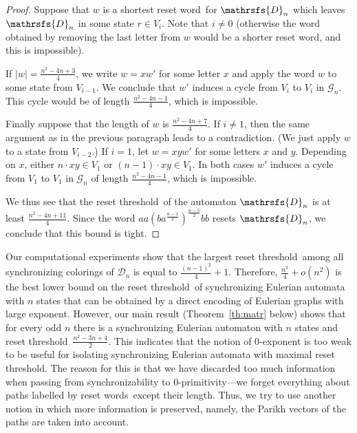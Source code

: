 \documentclass[11pt]{llncs}
\newcommand{\sw}{reset word}
\newcommand{\sws}{reset words}
\newcommand{\reth}{reset threshold}
\begin{document}
\begin{proof}
Suppose that $w$ is a shortest \sw\ for $\mathrsfs{D}_n$ which leaves
$\mathrsfs{D}_n$ in some state $r \in V_i$. Note that $i \neq 0$ (otherwise the
word obtained by removing the last letter from $w$ would be a shorter \sw, and
this is impossible).

If $|w|=\frac{n^2 -4n + 3}{4}$, we write $w = xw'$ for some letter $x$ and
apply the word $w$ to some state from $V_{i - 1}$. We conclude that $w'$
induces a cycle from $V_i$ to $V_i$ in $\mathcal{G}_n$. This cycle would be of
length $\frac{n^2 -4n - 1}{4}$, which is impossible.

Finally suppose that the length of $w$ is $\frac{n^2 -4n + 7}{4}$. If $i \neq
1$, then the same argument as in the previous paragraph leads to a
contradiction. (We just apply $w$ to a state from $V_{i - 2}$.)  If $i = 1$,
let $w = xyw'$ for some letters $x$ and $y$. Depending on $x$, either $n \cdot
xy \in V_1$ or $(n - 1) \cdot xy \in V_1$. In both cases $w'$ induces a cycle
from $V_1$ to $V_1$ in $\mathcal{G}_n$ of length $\frac{n^2 -4n - 1}{4}$, which
is impossible.

We thus see that the \reth\ of the automaton $\mathrsfs{D}_n$ is at least
$\frac{n^2 -4n + 11}{4}$. Since the word $aa(ba^{\frac{n - 1}{2}})^\frac{n -
5}{2}bb$ resets $\mathrsfs{D}_n$, we conclude that this bound is tight.
\end{proof}

Our computational experiments show that the largest \reth\ among all
synchronizing colorings of $\mathcal{D}_n$ is equal to $\frac{(n - 1)^2}{4} +
1$. Therefore, $\frac{n^2}{4} + o(n^2)$ is the best lower bound on the \reth\
of synchronizing Eulerian automata with $n$ states that can be obtained by a
direct encoding of Eulerian graphs with large exponent. However, our main
result (Theorem~\ref{th:matr} below) shows that for every odd $n$ there is a
synchronizing Eulerian automaton with $n$ states and \reth\ $\frac{n^2 -3n +
4}{2}$. This indicates that the notion of 0-exponent is too weak to be useful
for isolating synchronizing Eulerian automata with maximal \reth. The reason
for this is that we have discarded too much information when passing from
synchronizability to 0-primitivity---we forget everything about paths labelled
by \sws\ except their length. Thus, we try to use another notion in which more
information is preserved, namely, the Parikh vectors of the paths are taken
into account.
\end{document}
